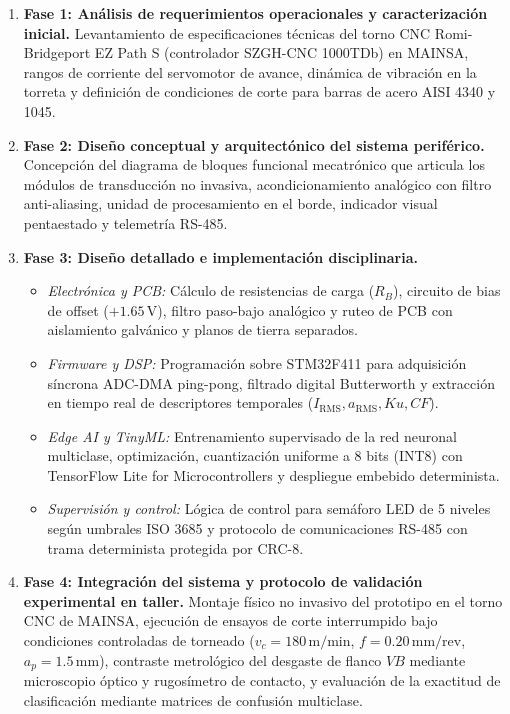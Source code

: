 \begin{enumerate}[leftmargin=0.8cm]
    \item \textbf{Fase 1: Análisis de requerimientos operacionales y caracterización inicial.} Levantamiento de especificaciones técnicas del torno CNC Romi-Bridgeport EZ Path S (controlador SZGH-CNC 1000TDb) en MAINSA, rangos de corriente del servomotor de avance, dinámica de vibración en la torreta y definición de condiciones de corte para barras de acero AISI 4340 y 1045.
    
    \item \textbf{Fase 2: Diseño conceptual y arquitectónico del sistema periférico.} Concepción del diagrama de bloques funcional mecatrónico que articula los módulos de transducción no invasiva, acondicionamiento analógico con filtro anti-aliasing, unidad de procesamiento en el borde, indicador visual pentaestado y telemetría RS-485.
    
    \item \textbf{Fase 3: Diseño detallado e implementación disciplinaria.}
    \begin{itemize}
        \item \textit{Electrónica y PCB:} Cálculo de resistencias de carga ($R_B$), circuito de bias de offset ($+1.65\,\text{V}$), filtro paso-bajo analógico y ruteo de PCB con aislamiento galvánico y planos de tierra separados.
        \item \textit{Firmware y DSP:} Programación sobre STM32F411 para adquisición síncrona ADC-DMA ping-pong, filtrado digital Butterworth y extracción en tiempo real de descriptores temporales ($I_{\text{RMS}}, a_{\text{RMS}}, Ku, CF$).
        \item \textit{Edge AI y TinyML:} Entrenamiento supervisado de la red neuronal multiclase, optimización, cuantización uniforme a 8 bits (INT8) con TensorFlow Lite for Microcontrollers y despliegue embebido determinista.
        \item \textit{Supervisión y control:} Lógica de control para semáforo LED de 5 niveles según umbrales ISO 3685 y protocolo de comunicaciones RS-485 con trama determinista protegida por CRC-8.
    \end{itemize}
    
    \item \textbf{Fase 4: Integración del sistema y protocolo de validación experimental en taller.} Montaje físico no invasivo del prototipo en el torno CNC de MAINSA, ejecución de ensayos de corte interrumpido bajo condiciones controladas de torneado ($v_c = 180\,\text{m/min}$, $f = 0.20\,\text{mm/rev}$, $a_p = 1.5\,\text{mm}$), contraste metrológico del desgaste de flanco $VB$ mediante microscopio óptico y rugosímetro de contacto, y evaluación de la exactitud de clasificación mediante matrices de confusión multiclase.
\end{enumerate}
